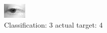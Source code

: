 \begin{figure}[h!]
\begin{center}
\includegraphics[width=0.60\columnwidth]{figures/ID2582_class_3_target_4.png}
\end{center}
\caption{ Classification: 3 actual target: 4}
\label{fig:ID2582_class_3_target_4}
\end{figure}
